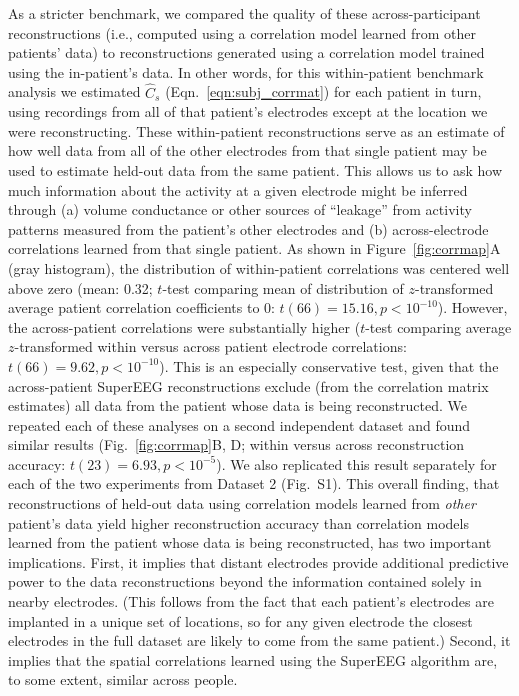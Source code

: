\documentclass[11pt]{article}
\newcommand{\perexpcorrmaps}{S1}
\begin{document}
As a stricter benchmark, we compared the quality of these
across-participant reconstructions (i.e., computed using a correlation
model learned from other patients' data) to reconstructions generated
using a correlation model trained using the in-patient's data.  In
other words, for this within-patient benchmark analysis we estimated
$\hat{C}_{s}$ (Eqn.~\ref{eqn:subj_corrmat}) for each patient in turn,
using recordings from all of that patient's electrodes except at the
location we were reconstructing.  These within-patient reconstructions
serve as an estimate of how well data from all of the other electrodes
from that single patient may be used to estimate held-out data from
the same patient.  This allows us to ask how much information about
the activity at a given electrode might be inferred through (a) volume
conductance or other sources of ``leakage'' from activity patterns
measured from the patient's other electrodes and (b) across-electrode
correlations learned from that single patient.  As shown in
Figure~\ref{fig:corrmap}A (gray histogram), the distribution of
within-patient correlations was centered well above zero (mean: 0.32;
$t$-test comparing mean of distribution of $z$-transformed
average patient correlation coefficients to 0: $t(66) = 15.16, p < 10^{-10}$).
However, the across-patient correlations were substantially higher
($t$-test comparing average $z$-transformed within versus across
patient electrode correlations: $t(66) = 9.62, p < 10^{-10}$).  This is an
especially conservative test, given that the across-patient SuperEEG
reconstructions exclude (from the correlation matrix estimates) all
data from the patient whose data is being reconstructed.  We repeated
each of these analyses on a second independent dataset and found
similar results (Fig.~\ref{fig:corrmap}B, D; within versus across
reconstruction accuracy: $t(23) = 6.93, p < 10^{-5}$). We also
replicated this result separately for each of the two experiments from
Dataset 2 (Fig.~\perexpcorrmaps).  This overall finding, that
reconstructions of held-out data using correlation models learned from
\textit{other} patient's data yield higher reconstruction accuracy
than correlation models learned from the patient whose data is being
reconstructed, has two important implications.  First, it implies that
distant electrodes provide additional predictive power to the data
reconstructions beyond the information contained solely in nearby
electrodes.  (This follows from the fact that each patient's
electrodes are implanted in a unique set of locations, so for any
given electrode the closest electrodes in the full dataset are likely
to come from the same patient.)  Second, it implies that the spatial
correlations learned using the SuperEEG algorithm are, to some extent,
similar across people.
\end{document}
